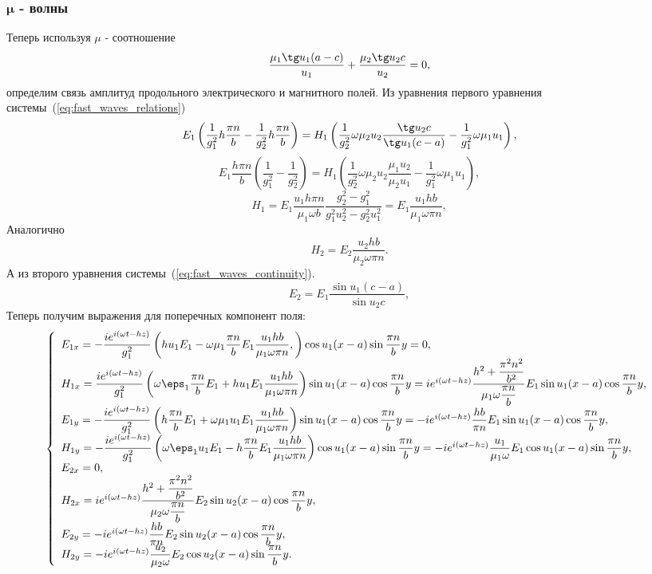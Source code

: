 \documentclass[12pt]{hedsemwork}
\renewcommand{\frac}{\dfrac}
\begin{document}
\subsubsection{\(\boldsymbol{\mu}\) - волны}
Теперь используя \( \mu \) - соотношение
\[
    \frac{\mu_1\tg u_1 (a-c)}{u_1} + \frac{\mu_2\tg u_2 c}{u_2} = 0,
\]
определим связь амплитуд продольного электрического и магнитного полей.
Из уравнения первого уравнения системы~(\ref{eq:fast_waves_relations})
\[
    E_1\left(\frac{1}{g_1^2} h \frac{\pi n}{b}-
    \frac{1}{g_2^2}h \frac{\pi n}{b}\right) =
    H_1\left(\frac{1}{g_2^2}\omega\mu_2u_2\frac{\tg u_2 c}{\tg u_1 (c-a)}-
    \frac{1}{g_1^2}\omega\mu_1u_1\right),
\]
\[
    E_1\frac{h\pi n}{b}\left(\frac{1}{g_1^2}-\frac{1}{g_2^2}\right)=
    H_1\left(\frac{1}{g_2^2}\omega\mu_2u_2\frac{\mu_1u_2}{\mu_2u_1}-
    \frac{1}{g_1^2}\omega\mu_1u_1\right),
\]
\[
    H_1 = E_1\frac{u_1h\pi n}{\mu_1\omega b}
    \frac{g_2^2-g_1^2}{g_1^2u_2^2 - g_2^2u_1^2} =
    E_1\frac{u_1hb}{\mu_1\omega\pi n},
\]
Аналогично
\[
    H_2 = E_2\frac{u_2hb}{\mu_2\omega\pi n}.
\]
А из второго уравнения системы~(\ref{eq:fast_waves_continuity}).
\[
    E_2 = E_1\frac{\sin u_1(c-a)}{\sin u_2 c},
\]
Теперь получим выражения для поперечных компонент поля:
\[
    \left\{
    \begin{array}{l}
        E_{1x} = -\frac{i e^{i(\omega t - h z)}}{g_1^2}
        \left(h u_1 E_1 -
        \omega\mu_1\frac{\pi n}{b}E_1\frac{u_1hb}{\mu_1\omega\pi n},\right)
        \cos u_1 (x-a) \sin \frac{\pi n}{b}y = 0,\\
        H_{1x} = \frac{i e^{i(\omega t - h z)}}{g_1^2}
        \left(\omega\eps_1\frac{\pi n}{b}E_1+
        h u_1 E_1\frac{u_1hb}{\mu_1\omega\pi n}\right)
        \sin u_1 (x-a) \cos \frac{\pi n}{b}y =
        i e^{i(\omega t - h z)}\frac{h^2 + \frac{\pi^2 n^2}{b^2}}
        {\mu_1\omega\frac{\pi n}{b}}E_1\sin u_1 (x-a) \cos \frac{\pi n}{b}y,\\
        E_{1y} = -\frac{i e^{i(\omega t - h z)}}{g_1^2}
        \left(h \frac{\pi n}{b} E_1 +
        \omega\mu_1u_1E_1\frac{u_1hb}{\mu_1\omega\pi n}\right)
        \sin u_1 (x-a) \cos \frac{\pi n}{b}y = -i e^{i(\omega t - h z)}
        \frac{hb}{\pi n} E_1\sin u_1 (x-a) \cos \frac{\pi n}{b}y,\\
        H_{1y} = -\frac{i e^{i(\omega t - h z)}}{g_1^2}
        \left(\omega\eps_1u_1E_1-
        h \frac{\pi n}{b} E_1\frac{u_1hb}{\mu_1\omega\pi n}\right)
        \cos u_1 (x-a) \sin \frac{\pi n}{b}y = -i e^{i(\omega t - h z)}
        \frac{u_1}{\mu_1\omega}E_1\cos u_1 (x-a) \sin \frac{\pi n}{b}y,\\
        E_{2x} = 0,\\
        H_{2x} = i e^{i(\omega t - h z)} \frac{h^2 + \frac{\pi^2 n^2}{b^2}}
        {\mu_2\omega\frac{\pi n}{b}} E_2\sin u_2 (x-a) \cos \frac{\pi n}{b}y,\\
        E_{2y} = -i e^{i(\omega t - h z)}
        \frac{hb}{\pi n} E_2\sin u_2 (x-a) \cos \frac{\pi n}{b}y,\\
        H_{2y} = -i e^{i(\omega t - h z)}
        \frac{u_2}{\mu_2\omega}E_2\cos u_2 (x-a) \sin \frac{\pi n}{b}y.\\
    \end{array}
    \right.
\]
\end{document}
